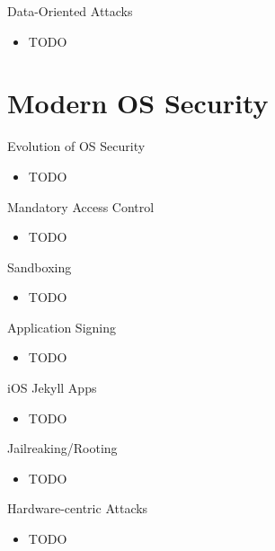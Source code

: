 \documentclass{curs}
\begin{document}
\begin{frame}{Data-Oriented Attacks}
  \begin{itemize}
    \item TODO
  \end{itemize}
\end{frame}

\section{Modern OS Security}

\begin{frame}{Evolution of OS Security}
  \begin{itemize}
    \item TODO
  \end{itemize}
\end{frame}

\begin{frame}{Mandatory Access Control}
  \begin{itemize}
    \item TODO
  \end{itemize}
\end{frame}

\begin{frame}{Sandboxing}
  \begin{itemize}
    \item TODO
  \end{itemize}
\end{frame}

\begin{frame}{Application Signing}
  \begin{itemize}
    \item TODO
  \end{itemize}
\end{frame}

\begin{frame}{iOS Jekyll Apps}
  \begin{itemize}
    \item TODO
  \end{itemize}
\end{frame}

\begin{frame}{Jailreaking/Rooting}
  \begin{itemize}
    \item TODO
  \end{itemize}
\end{frame}

\begin{frame}{Hardware-centric Attacks}
  \begin{itemize}
    \item TODO
  \end{itemize}
\end{frame}
\end{document}
